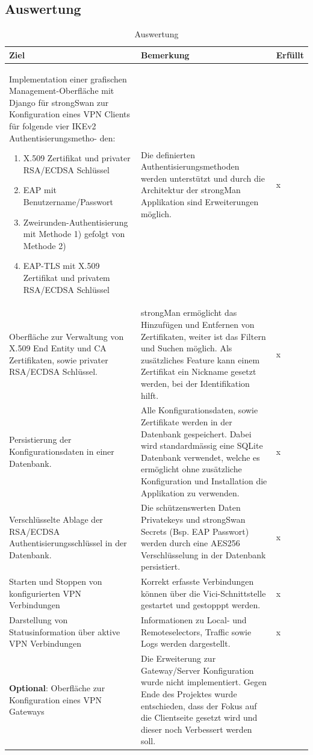 \subsection{Auswertung}
\begin{table}[H]
	\centering
    \begin{tabular}{|p{}|p{}|p{}|}
    \hline    
    \rowcolor{lightblue}
	Ziel &  Bemerkung & Erfüllt \\ \hline   
	Implementation einer grafischen Management-Oberfläche mit Django für strongSwan
    zur Konfiguration eines VPN Clients für folgende vier IKEv2 Authentisierungsmetho-
    den:
    \begin{enumerate}
        \item X.509 Zertifikat und privater RSA/ECDSA Schlüssel
        \item EAP mit Benutzername/Passwort
        \item Zweirunden-Authentisierung mit Methode 1) gefolgt von Methode 2)
        \item EAP-TLS mit X.509 Zertifikat und privatem RSA/ECDSA Schlüssel
    \end{enumerate}
	& Die definierten Authentisierungsmethoden werden unterstützt und durch die Architektur der strongMan Applikation sind Erweiterungen möglich. & x  \\ \hline
	Oberfläche zur Verwaltung von X.509 End Entity und CA Zertifikaten, sowie privater
    RSA/ECDSA Schlüssel. & strongMan ermöglicht das Hinzufügen und Entfernen von Zertifikaten,  weiter ist das Filtern und Suchen möglich. Als zusätzliches Feature kann einem Zertifikat ein Nickname gesetzt werden, bei der Identifikation hilft.& x
    \\ \hline
    Persistierung der Konfigurationsdaten in einer Datenbank. & Alle Konfigurationsdaten, sowie Zertifikate werden in der Datenbank gespeichert. Dabei wird standardmässig eine SQLite Datenbank verwendet, welche es ermöglicht ohne zusätzliche Konfiguration und Installation die Applikation zu verwenden. & x \\ \hline
    Verschlüsselte Ablage der RSA/ECDSA Authentisierungsschlüssel in der Datenbank. & Die schützenswerten Daten Privatekeys und strongSwan Secrets (Bsp. EAP Passwort) werden durch eine AES256 Verschlüsselung in der Datenbank persistiert. & x \\ \hline
    Starten und Stoppen von konfigurierten VPN Verbindungen & Korrekt erfasste Verbindungen können über die Vici-Schnittstelle gestartet und gestopppt werden. & x \\ \hline
    Darstellung von Statusinformation über aktive VPN Verbindungen & Informationen zu Local- und Remoteselectors, Traffic sowie Logs werden dargestellt. & x \\ \hline
    \textbf{Optional}: Oberfläche zur Konfiguration eines VPN Gateways & Die Erweiterung zur Gateway/Server Konfiguration wurde nicht implementiert. Gegen Ende des Projektes wurde entschieden, dass der Fokus auf die Clientseite gesetzt wird und dieser noch Verbessert werden soll. &  \\ \hline 
    \end{tabular}
    \caption[Auswertung]{Auswertung}
\end{table}
\medskip \medskip